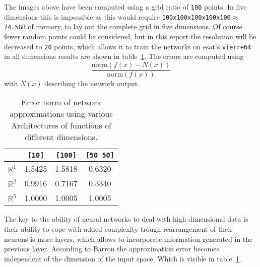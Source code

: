The images above have been computed using a grid ratio of \texttt{100} points. In five dimensions this is impossible as this would require \texttt{100x100x100x100x100}$\approx$\texttt{74.5GB} of memory, to lay out the complete grid in five dimensions. Of course fewer random points could be considered, but in this report the resolution will be decreased to \texttt{20} points, which allows it to train the networks on esat's \texttt{vierre64} in all dimensions results are shown in table~\ref{tab:netErr}. The errors are computed using
\begin{equation}
\frac{\text{norm}(f(x) - N(x))}{\text{norm}(f(x))} 
\end{equation}
with $N(x)$ describing the network output.
\begin{table}
\centering
\begin{tabular}{|c|c|c|c|}\hline
                  &\texttt{[10]} & \texttt{[100]} & \texttt{[50 50]} \\ \hline
$\mathbb{R}^1$   & 1.5425       &   1.5818       &  0.6320 \\
$\mathbb{R}^2$   & 0.9916       &   0.7167       &  0.3340 \\
$\mathbb{R}^5$   & 1.0000       &   1.0005       &  1.0005 \\ \hline
\end{tabular}
\caption{Error norm of network approximations using various Architectures of functions of different dimensions.}
\label{tab:netErr}
\end{table}
The key to the ability of neural networks to deal with high dimensional data is their ability to cope with added complexity trough rearrangement of their neurons is more layers, which allows to incorporate information generated in the previous layer. According to Barron the approximation error becomes independent of the dimension of the input space. Which is visible in table~\ref{tab:netErr}.


